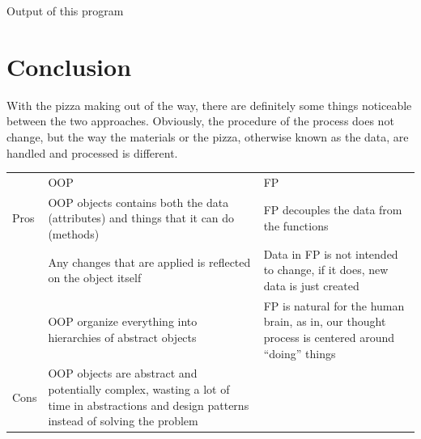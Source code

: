 \documentclass[a4paper]{article}
\numberwithin{equation}{section}
\begin{document}
Output of this program

\newpage
\section{Conclusion}
With the pizza making out of the way, there are definitely some things noticeable between the two approaches.
Obviously, the procedure of the process does not change, but the way the materials or the pizza, otherwise known as the data, are handled and processed is different.

\begin{center}
  \begin{tabularx}{\textwidth}{l*{2}{X}}
    \toprule
         & OOP                                                                                                                                                                                                    & FP                                                                                                \\
    \cmidrule(lr){2-3}
    Pros & OOP objects contains both the data (attributes) and things that it can do (methods)                                                                                                                    & FP decouples the data from the functions                                                          \\
         & Any changes that are applied is reflected on the object itself                                                                                                                                         & Data in FP is not intended to change, if it does, new data is just created                        \\
         & OOP organize everything into hierarchies of abstract objects                                                                                                                                           & FP is natural for the human brain, as in, our thought process is centered around ``doing'' things \\
    \midrule
    Cons & OOP objects are abstract and potentially complex, wasting a lot of time in abstractions and design patterns instead of solving the problem                                                             &                                                                                                   \\

\end{tabularx}
\end{center}
\end{document}
